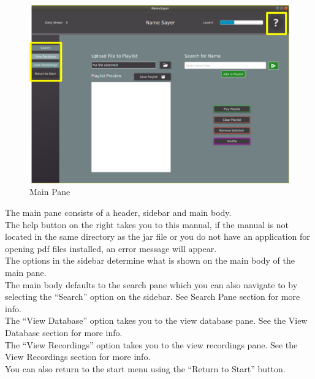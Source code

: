\documentclass[a4paper,12pt]{article}
\begin{document}
\begin{figure}[!h]
	\includegraphics[width=\linewidth]{mainpane.png}
	\caption{Main Pane}
\end{figure}
The main pane consists of a header, sidebar and main body.
\\


The help button on the right takes you to this manual, if the manual is not located in the same directory as the jar file or you do not have an application for opening pdf files installed, an error message will appear.
\\


The options in the sidebar determine what is shown on the main body of the main pane.
\\


The main body defaults to the search pane which you can also navigate to by selecting the “Search” option on the sidebar. See Search Pane section for more info.
\\


The “View Database” option takes you to the view database pane. See the View Database section for more info.
\\


The “View Recordings” option takes you to the view recordings pane. See the View Recordings section for more info.
\\


You can also return to the start menu using the “Return to Start” button.
\newpage
\end{document}
